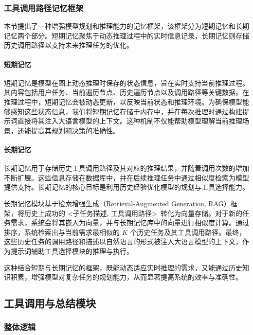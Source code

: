\subsubsection{工具调用路径记忆框架}

本节提出了一种增强模型规划和推理能力的记忆框架，该框架分为短期记忆和长期记忆两个部分。短期记忆聚焦于动态推理过程中的实时信息记录，长期记忆则存储历史调用路径以支持未来推理任务的优化。

\paragraph{短期记忆}

短期记忆是模型在图上动态推理时保存的状态信息，旨在实时支持当前推理过程。其内容包括用户任务、当前遍历节点、历史遍历节点以及调用路径等关键数据。在推理过程中，短期记忆会被动态更新，以反映当前状态和推理环境。为确保模型能够感知这些状态信息，我们将短期记忆存储于内存中，并在每次推理时通过构建提示词直接将其注入大语言模型的上下文。这种机制不仅能帮助模型理解当前推理场景，还能提高其规划和决策的准确性。

\paragraph{长期记忆}

长期记忆用于存储历史工具调用路径及其对应的推理结果，并随着调用次数的增加不断扩展。这些信息存储在数据库中，并在后续推理任务中通过相似度检索为模型提供支持。长期记忆的核心目标是利用历史经验优化模型的规划与工具选择能力。

长期记忆模块基于检索增强生成（Retrieval-Augmented Generation, RAG）框架，将历史上成功的 \textless 子任务描述, 工具调用路径\textgreater\ 转化为向量存储。对于新的任务需求，系统会将其嵌入为向量，并与长期记忆库中的向量进行相似度计算。通过排序，系统检索出与当前需求最相似的 \(K\) 个历史任务及其工具调用路径。最终，这些历史任务的调用路径和描述以自然语言的形式被注入大语言模型的上下文，作为提示词辅助工具选择模块的推理与执行。

这种结合短期与长期记忆的框架，既能动态适应实时推理的需求，又能通过历史知识积累，增强模型对复杂任务的规划能力，从而显著提高系统的效率与准确性。

\subsection{工具调用与总结模块}
\label{sec:real_tool_simulation}

\subsubsection{整体逻辑}

